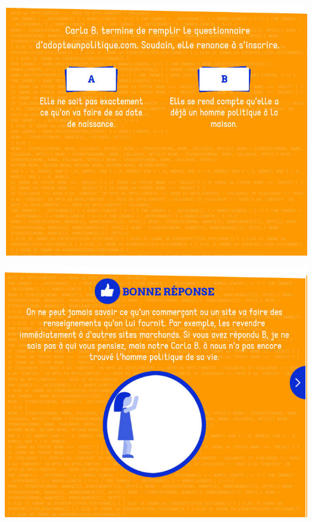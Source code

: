 \documentclass{beamer}
\begin{document}
\begin{frame}\includegraphics[scale=0.6] {./images/Quizz_HygieneNumerique_France4_20.jpg} \end{frame}
\begin{frame}\includegraphics[scale=0.6] {./images/Quizz_HygieneNumerique_France4_21.jpg} \end{frame}
\end{document}

